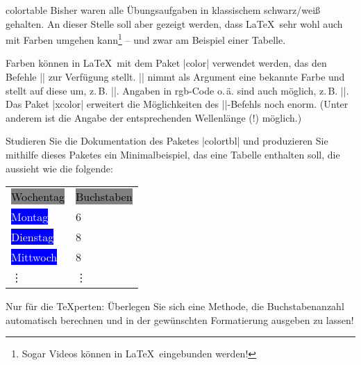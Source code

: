 \documentclass[
	draft,
	blatt=5,
	ausgabe=14.\,05.\,2010,
	rückgabe=21.\,05.\,2010
]{lcourse-hd}
\begin{document}
\begin{exercise}[
  name={Tabellen – in Farbe!},
  punkte=5,
  abgabe = Quellcode per Mail{,} Quellcode und fertiges Dokument (schwarz-weiß) ausgedruckt.]{colortable}
Bisher waren alle Übungsaufgaben in klassischem schwarz/weiß gehalten. An dieser Stelle soll aber gezeigt werden, dass \LaTeX\ sehr wohl auch mit Farben umgehen kann\footnote{Sogar Videos können in \LaTeX\ eingebunden werden!} – und zwar am Beispiel einer Tabelle.

Farben können in \LaTeX\ mit dem Paket |color| verwendet werden, das den Befehle |\color{}| zur Verfügung stellt. |\color{}| nimmt als Argument eine bekannte Farbe und stellt auf diese um, z.\,B. |\color{blue}|. Angaben in rgb-Code o.\,ä. sind auch möglich, z.\,B. |\color[gray]{0.8}|. Das Paket |xcolor| erweitert die Möglichkeiten des |\color|-Befehls noch enorm. (Unter anderem ist die Angabe der entsprechenden Wellenlänge (!) möglich.)

Studieren Sie die Dokumentation des Paketes |colortbl| und produzieren Sie mithilfe dieses Paketes ein Minimalbeispiel, das eine Tabelle enthalten soll, die aussieht wie die folgende:
\par 
\centering
\begin{tabular}{l!{\hspace*{-4.3mm}}l}
\colorbox{gray}{\textcolor{black}{Wochentag}} & \colorbox{gray}{\textcolor{black}{Buchstaben\vphantom{Wg}}}\\
\colorbox{blue}{\textcolor{white}{Montag\hspace*{.8em}}} & 6 \\
\colorbox{blue}{\textcolor{white}{Dienstag\hspace*{.34em}}} & 8\\
\colorbox{blue}{\textcolor{white}{Mittwoch}} &  8\\
\vdots & \vdots \\
\end{tabular}
Nur für die \TeX perten: Überlegen Sie sich eine Methode, die Buchstabenanzahl automatisch berechnen und in der gewünschten Formatierung ausgeben zu lassen!
\end{exercise}
\end{document}
